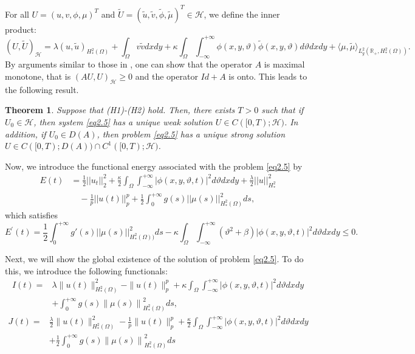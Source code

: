 \documentclass[12pt]{article}
\numberwithin{equation}{section}
\newtheorem{theorem}{Theorem}[section]
\begin{document}
For all $U=(u, v, \phi, \mu)^{T}$ and $\tilde{U}=(\tilde{u}, \tilde{v}, \tilde{\phi}, \tilde{\mu})^{T} \in \mathcal{H}$, we define the inner product:
$$(U, \tilde{U})_{\mathcal{H}}=\lambda(u, \tilde{u})_{H^2_{*} (\Omega)}+\displaystyle\int_\Omega v \tilde{v} dx dy+\kappa \displaystyle\int_{\Omega} \int_{-\infty}^{+\infty} \phi(x, y, \vartheta) \tilde{\phi}(x, y, \vartheta) d\vartheta dx dy+ \bigl \langle \mu, \tilde{\mu} \bigr \rangle_{L_g^2 (\mathbb{R}_+, H^2_{*} (\Omega) )}.$$
By arguments similar to those in \cite{aslam25, ZH}, one can show that the operator $A$ is maximal monotone, that is $(A U, U)_{\mathcal{H}}\geq 0$  and the operator $Id + A $ is onto. This leads to the following result. 
\begin{theorem}
Suppose that (H1)-(H2) hold. Then, there exists $T>0$ such that if $U_0\in \mathcal{H}$, then system \eqref{eq2.5} has a unique weak solution $U\in C([0, T); \mathcal{H})$. In addition, if $U_0\in D(A)$, then problem \eqref{eq2.5} has a unique strong solution
$U\in C([0, T); D(A))\cap C^1([0, T); \mathcal{H})$.
\end{theorem}
Now, we introduce the functional energy associated with the problem \eqref{eq2.5}  by
\begin{equation}\label{eq2.6}
\begin{split}
E(t)
&= \frac{1}{2} ||u_t||_2^2 + \frac{\kappa}{2} \int_{\Omega} \int_{-\infty}^{+\infty} | \phi(x,y,\vartheta,t)|^2 d\vartheta dxdy + \frac{\lambda}{2} ||u||^2_{H^2_{*}}
\\
&\quad -\frac{1}{p} || u(t)||_p^p +\frac{1}{2} \int_{0}^{+\infty} g(s) ||\mu(s)||^2_{H^2_{*}(\Omega)} ds,
\end{split}
\end{equation}
which  satisfies 
\begin{equation}\label{eq2.7}
E^{\prime}(t)
= \frac{1}{2} \int_{0}^{+\infty} g'(s) ||\mu(s)||^2_{H^2_{*}(\Omega))} ds
 -\kappa \int_{\Omega} \int_{-\infty}^{+\infty} (\vartheta^2 + \beta) |\phi(x,y,\vartheta,t)|^2 d\vartheta dx dy \leq 0.
\end{equation}

Next, we will show the global existence of the solution of problem \eqref{eq2.5}. To do this,  we introduce the following functionals:
\begin{equation}
\begin{aligned}
I(t)= & \lambda\|u(t)\|_{H^2_{*} (\Omega)}^{2}-\|u(t)\|_{p}^{p}+\kappa \int_{\Omega} \int_{-\infty}^{+\infty}|\phi(x,y,\vartheta, t)|^{2} d\vartheta dx dy\\
& +\int_{0}^{+\infty} g(s)\left\|\mu(s)\right\|^{2}_{H^2_{*} (\Omega)} ds,
\end{aligned}
\end{equation}
\begin{equation}
\begin{aligned}
J(t)= & \frac{\lambda}{2}\|u(t)\|_{H^2_{*} (\Omega)}^{2}-\frac{1}{p}\|u(t)\|_{p}^{p}+\frac{\kappa}{2} \int_{\Omega} \int_{-\infty}^{+\infty}|\phi(x,y,\vartheta, t)|^{2} d\vartheta dx dy \\
& +\frac{1}{2} \int_{0}^{+\infty} g(s)\left\|\mu(s)\right\|^{2}_{H^2_{*} (\Omega)} ds
\end{aligned}
\end{equation}
\end{document}
